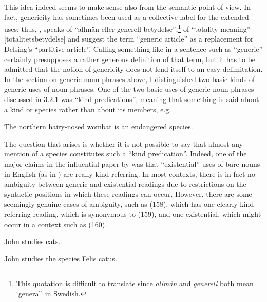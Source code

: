 
This idea indeed seems to make sense also from the semantic point of view. In fact, genericity has sometimes been used as a collective label for the extended uses: thus, \citet[134]{Hummelstedt1934}, speaks of “allmän eller generell betydelse”,\footnote{ This quotation is difficult to translate since \textit{allmän} and \textit{generell} both mean ‘general’ in Swedish.} \citet[29]{Marklund1976} of “totality meaning” [totalitetsbetydelse] and \citet{BergholmEtAl1999} suggest the term “generic article” as a replacement for Delsing’s “partitive article”. Calling something like  in a sentence such as  “generic” certainly presupposes a rather generous definition of that term, but it has to be admitted that the notion of genericity does not lend itself to an easy delimitation. In the section on generic noun phrases above, I distinguished two basic kinds of generic uses of noun phrases. One of the two basic uses of generic noun phrases discussed in 3.2.1 was “kind predications”, meaning that something is said about a kind or species rather than about its members, e.g. 


\ea
\gl The northern hairy-nosed wombat is an endangered species. 
\z 

The question that arises is whether it is not possible to say that almost any mention of a species constitutes such a “kind predication”. Indeed, one of the major claims in the influential paper by \citet{Carlson1977} was that “existential” uses of bare nouns in English (as in ) are really kind-referring. In most contexts, there is in fact no ambiguity between generic and existential readings due to restrictions on the syntactic positions in which these readings can occur. However, there are some seemingly genuine cases of ambiguity, such as (158), which has one clearly kind-referring reading, which is synonymous to (159), and one existential, which might occur in a context such as (160).

\ea
\gl \label{bkm:Ref107049066}John studies cats.  
 \z

\ea 
\gl \label{bkm:Ref107049087}John studies the species Felis catus.
\z 

